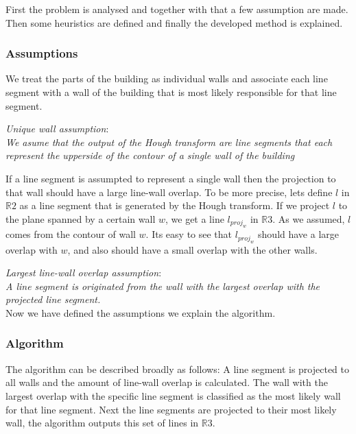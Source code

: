\documentclass[10pt]{article}
\begin{document}
	First the problem is analysed and together with that a few assumption are made.
	Then some heuristics are defined and finally the developed method is explained.

	\subsubsection{Assumptions}
	We treat the parts of the building as individual walls and associate each
	line segment with a wall of the building that is most likely responsible for
	that line segment. 

	\emph{Unique wall assumption}:\\
	\emph{We asume that the output of the Hough transform are line segments that
	each represent the upperside of the contour of a single wall of the building}



	If a line segment is assumpted to represent a single wall then the
	projection to that wall should have a large line-wall overlap. To be more
	precise, lets define $l$ in $\mathbb{R}2$ as a line segment that is generated by the Hough
	transform.  If we project $l$ to the plane spanned by a certain wall $w$, we
	get a line $l_{proj_w}$ in $\mathbb{R}3$.  As we assumed, $l$ comes from the 
	contour of wall $w$. Its easy to see that $l_{proj_w}$
	should have a large overlap with $w$, and also should have a small overlap with
	the other walls.
	
	\emph{Largest line-wall overlap assumption}:\\
	\emph{A line segment is originated from the wall with the largest overlap
	with the projected line segment.}\\

	Now we have defined the assumptions we explain the algorithm.

	\subsubsection{Algorithm}
	The algorithm can be described broadly as follows:
	A line segment is projected to all walls and the amount of line-wall overlap is
	calculated. The wall with the largest overlap with the specific line
segment is classified as the most likely wall for that line segment.
	Next the line segments are projected to their most likely wall, the
	algorithm outputs this set of lines in $\mathbb{R}3$. 
	
\end{document}
